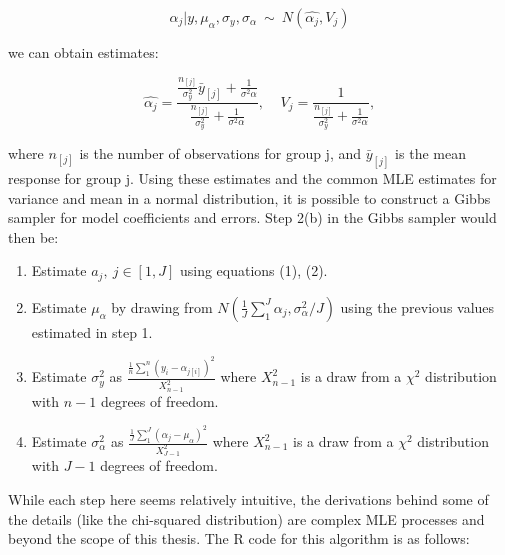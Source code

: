 \documentclass[]{article}
\begin{document}
\begin{equation}
  \alpha_j|y, \mu_{\alpha}, \sigma_y, \sigma_{\alpha} \ \sim \ N(\hat{\alpha_j}, V_j)
\end{equation}

we can obtain estimates:

\begin{equation}
\hat{\alpha_j} = \frac{\frac{n_{[j]}}{\sigma^2_y}\bar{y}_{[j]} + \frac{1}{\sigma^2{\alpha}}}{\frac{n_{[j]}}{\sigma^2_y} + \frac{1}{\sigma^2{\alpha}}},\ \ \ \ \  V_j = \frac{1}{\frac{n_{[j]}}{\sigma^2_y} + \frac{1}{\sigma^2{\alpha}}},
\end{equation}

where \(n_{[j]}\) is the number of observations for group j, and
\(\bar{y}_{[j]}\) is the mean response for group j. Using these
estimates and the common MLE estimates for variance and mean in a normal
distribution, it is possible to construct a Gibbs sampler for model
coefficients and errors. Step 2(b) in the Gibbs sampler would then be:

\begin{enumerate}
  \item Estimate $a_j, \ j\in[1,J]$ using equations (1), (2).
  \item Estimate $\mu_{\alpha}$ by drawing from $N(\frac{1}{J}\sum_{1}^{J}\alpha_j, \sigma_{\alpha}^2/J)$ using the previous values estimated in step 1.
  \item Estimate $\sigma_y^2$ as $\frac{\frac{1}{n}\sum_{1}^{n}(y_i - \alpha_{j[i]})^2}{X_{n-1}^2}$ where $X_{n-1}^2$ is a draw from a $\chi^2$ distribution with $n-1$ degrees of freedom.
  \item Estimate $\sigma_{\alpha}^2$ as $\frac{\frac{1}{J}\sum_{1}^{J}(\alpha_j - \mu_{\alpha})^2}{X_{J-1}^2}$ where $X_{n-1}^2$ is a draw from a $\chi^2$ distribution with $J-1$ degrees of freedom.
\end{enumerate}

While each step here seems relatively intuitive, the derivations behind
some of the details (like the chi-squared distribution) are complex MLE
processes and beyond the scope of this thesis. The R code for this
algorithm is as follows:
\end{document}
